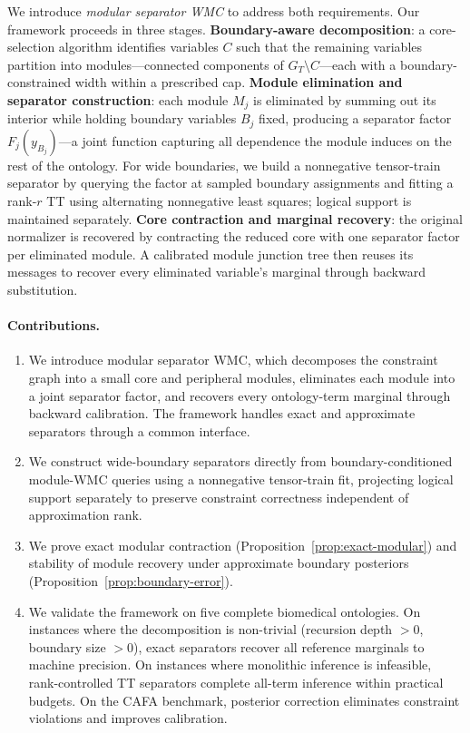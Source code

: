 \documentclass[12pt]{article}
\begin{document}
We introduce \emph{modular separator WMC} to address both requirements.
Our framework proceeds in three stages. \textbf{Boundary-aware
decomposition}: a core-selection algorithm identifies variables $C$
such that the remaining variables partition into modules---connected
components of $G_T \setminus C$---each with a boundary-constrained
width within a prescribed cap. \textbf{Module elimination and separator
construction}: each module $M_j$ is eliminated by summing out its
interior while holding boundary variables $B_j$ fixed, producing a
separator factor $F_j(y_{B_j})$---a joint function capturing all
dependence the module induces on the rest of the ontology. For wide
boundaries, we build a nonnegative tensor-train separator by querying
the factor at sampled boundary assignments and fitting a rank-$r$ TT
using alternating nonnegative least squares; logical support is
maintained separately. \textbf{Core contraction and marginal recovery}:
the original normalizer is recovered by contracting the reduced core
with one separator factor per eliminated module. A calibrated module
junction tree then reuses its messages to recover every eliminated
variable's marginal through backward substitution.

\paragraph{Contributions.}
\begin{enumerate}
  \item We introduce modular separator WMC, which decomposes the
  constraint graph into a small core and peripheral modules, eliminates
  each module into a joint separator factor, and recovers every
  ontology-term marginal through backward calibration. The framework
  handles exact and approximate separators through a common interface.

  \item We construct wide-boundary separators directly from
  boundary-conditioned module-WMC queries using a nonnegative
  tensor-train fit, projecting logical support separately to preserve
  constraint correctness independent of approximation rank.

  \item We prove exact modular contraction
  (Proposition~\ref{prop:exact-modular}) and stability of module
  recovery under approximate boundary posteriors
  (Proposition~\ref{prop:boundary-error}).

  \item We validate the framework on five complete biomedical
  ontologies. On instances where the decomposition is non-trivial
  (recursion depth $> 0$, boundary size $> 0$), exact separators recover
  all reference marginals to machine precision. On instances where
  monolithic inference is infeasible, rank-controlled TT separators
  complete all-term inference within practical budgets. On the CAFA
  benchmark, posterior correction eliminates constraint violations and
  improves calibration.
\end{enumerate}
\end{document}
